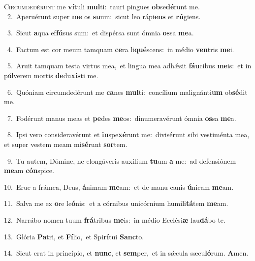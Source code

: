 \lettrine{\initial\textcolor{\initialcolor}{C}}{ircumdedérunt} me \textbf{ví}\-tuli \textbf{mul}\-ti:~\star tauri pingues \textbf{ob}\-se\-\textbf{dé}\-runt me.\\
{\numbfont\textcolor{\numbcolor}{~2.}}~Aperuérunt super \textbf{me} os \textbf{su}\-um:~\star sicut leo rápi\textbf{ens} et \textbf{rú}\-giens.\par
{\numbfont\textcolor{\numbcolor}{~3.}}~Sicut \textbf{a}\-qua ef\-\textbf{fú}\-sus sum:~\star et dispérsa sunt ómnia \textbf{os}\-sa \textbf{me}\-a.\par
{\numbfont\textcolor{\numbcolor}{~4.}}~Factum est cor meum tamquam \textbf{ce}\-ra li\-\textbf{qué}\-scens:~\star in médio \textbf{ven}\-tris \textbf{me}\-i.\par
{\numbfont\textcolor{\numbcolor}{~5.}}~Aruit tamquam testa virtus mea,~\dagger et lingua mea adhǽsit \textbf{fáu}\-cibus \textbf{me}\-is:~\star et in púlverem mortis \textbf{de}\-du\-\textbf{xís}\-ti me.\par
{\numbfont\textcolor{\numbcolor}{~6.}}~Quóniam circumdedérunt me \textbf{ca}\-nes \textbf{mul}\-ti:~\star concílium malignánti\textbf{um} ob\-\textbf{sé}\-dit me.\par
{\numbfont\textcolor{\numbcolor}{~7.}}~Fodérunt manus meas et \textbf{pe}\-des \textbf{me}\-os:~\star dinumeravérunt ómnia \textbf{os}\-sa \textbf{me}\-a.\par
{\numbfont\textcolor{\numbcolor}{~8.}}~Ipsi vero consideravérunt et \textbf{in}\-spe\-\textbf{xé}\-runt me:~\star divisérunt sibi vestiménta mea, et super vestem meam mi\-\textbf{sé}\-runt \textbf{sor}\-tem.\par
{\numbfont\textcolor{\numbcolor}{~9.}}~Tu autem, Dómine, ne elongáveris auxílium \textbf{tu}\-um \textbf{a} me:~\star ad defensiónem \textbf{me}\-am \textbf{cón}\-spice.\par
{\numbfont\textcolor{\numbcolor}{10.}}~Erue a frámea, Deus, \textbf{á}\-nimam \textbf{me}\-am:~\star et de manu canis \textbf{ú}\-nicam \textbf{me}\-am.\par
{\numbfont\textcolor{\numbcolor}{11.}}~Salva me ex \textbf{o}\-re le\-\textbf{ó}\-nis:~\star et a córnibus unicórnium humili\-\textbf{tá}\-tem \textbf{me}\-am.\par
{\numbfont\textcolor{\numbcolor}{12.}}~Narrábo nomen tuum \textbf{frá}\-tribus \textbf{me}\-is:~\star in médio Ecclési\textbf{æ} lau\-\textbf{dá}\-bo te.\par
{\numbfont\textcolor{\numbcolor}{13.}}~Glória \textbf{Pa}\-tri, et \textbf{Fí}\-lio,~\star et Spi\-\textbf{rí}\-tui \textbf{Sanc}\-to.\par
{\numbfont\textcolor{\numbcolor}{14.}}~Sicut erat in princípio, et \textbf{nunc}\-, et \textbf{sem}\-per,~\star et in sǽcula sæcu\-\textbf{ló}\-rum. \textbf{A}\-men.\par
